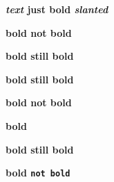 \documentclass[12pt]{article}
\newcommand\"{quote}
\begin{document}
\textbf{\textit{text} just bold \textsl{slanted}}


\textbf{bold \textnormal{not bold}}


\textbf{bold \textsf{still bold}}

\textbf{bold \textup{still bold}}

\textbf{bold \textmd{not bold}}

\textbf{bold }

\textbf{bold \textbf{still bold}}

\textbf{bold \texttt{not bold}}
\end{document}

